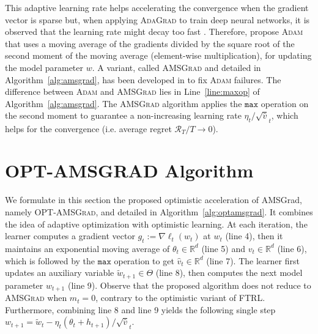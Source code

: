 \documentclass[twoside]{article}
\begin{document}
This adaptive learning rate helps accelerating the convergence when the gradient vector is sparse \citep{DHS11} but, when applying \textsc{AdaGrad} to train deep neural networks, it is observed that the learning rate might decay too fast \citep{KB15}.
Therefore, \cite{KB15} propose \textsc{Adam} that uses a moving average of the gradients divided by the square root of the second moment of the moving average (element-wise multiplication), for updating the model parameter $w$.
A variant, called \textsc{AMSGrad} and detailed in Algorithm~\ref{alg:amsgrad}, has been developed in \citep{RKK18} to fix \textsc{Adam} failures.
The difference between \textsc{Adam} and \textsc{AMSGrad} lies in Line~\ref{line:maxop} of Algorithm~\ref{alg:amsgrad}.
The \textsc{AMSGrad} algorithm \citep{RKK18} applies the $\texttt{max}$ operation on the second moment to guarantee a non-increasing learning rate $\eta_t / \sqrt{\hat{v}}_t $, which helps for the convergence (i.e. average regret $\mathcal{R}_T/T \rightarrow 0$).


\vspace{-0.1in}
\section{\textsc{OPT-AMSGRAD} Algorithm}\label{sec:opt}
\vspace{-0.05in}

We formulate in this section the proposed optimistic acceleration of AMSGrad, namely \textsc{OPT-AMSGrad}, and detailed in Algorithm~\ref{alg:optamsgrad}.  
It combines the idea of adaptive optimization with optimistic learning. 
At each iteration, the learner computes a gradient vector $g_{t}:= \nabla \ell_t( w_t)$ at $w_{t}$ (line 4), then it maintains an exponential moving average of $\theta_{t} \in \mathbb R^{d}$ (line 5) and $v_{t} \in \mathbb R^{d}$ (line 6), which is followed by the $\texttt{max}$ operation to get $\hat{v}_{t} \in \mathbb R^{d}$ (line 7). 
The learner first updates an auxiliary variable $\tilde{w}_{t+1} \in \Theta$ (line 8), then computes the next model parameter $w_{t+1}$ (line 9).
Observe that the proposed algorithm does not reduce to \textsc{AMSGrad} when $m_{t}=0$, contrary to the optimistic variant of \textsc{FTRL}.
Furthermore, combining line 8 and line 9 yields the following single step $w_{t+1}= \tilde{w}_{t}  - \eta_t (\theta_t + h_{t+1} )/ \sqrt{\hat{v}}_t $. 
\end{document}
